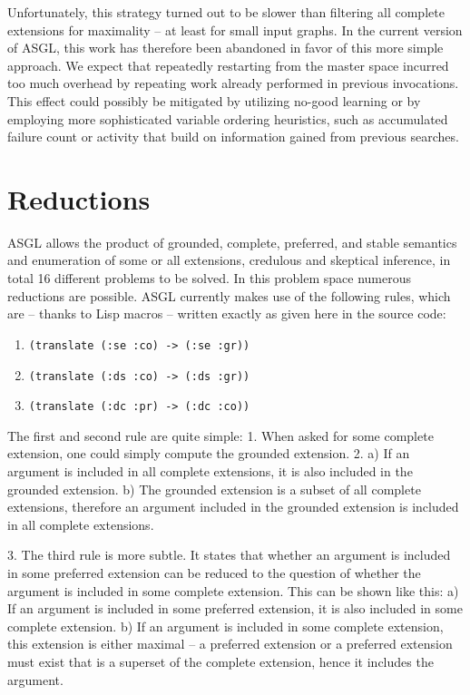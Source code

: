 \documentclass[runningheads,a4paper]{llncs}
\begin{document}
Unfortunately, this strategy turned out to be slower than filtering
all complete extensions for maximality -- at least for small input
graphs. In the current version of ASGL, this work has therefore been
abandoned in favor of this more simple approach. We expect that
repeatedly restarting from the master space incurred too much overhead
by repeating work already performed in previous invocations. This
effect could possibly be mitigated by utilizing no-good learning or by
employing more sophisticated variable ordering heuristics, such as
accumulated failure count or activity that build on
information gained from previous searches.

\section{Reductions}\label{sec:reductions}

ASGL allows the product of grounded, complete, preferred, and stable
semantics and enumeration of some or all extensions, credulous and
skeptical inference, in total 16 different problems to be solved. In
this problem space numerous reductions are possible. ASGL currently
makes use of the following rules, which are -- thanks to Lisp macros
-- written exactly as given here in the source code:

\begin{enumerate}
\item \texttt{(translate (:se :co) -> (:se :gr))}
\item \texttt{(translate (:ds :co) -> (:ds :gr))}
\item \texttt{(translate (:dc :pr) -> (:dc :co))}
\end{enumerate}

The first and second rule are quite simple: 1. When asked for some
complete extension, one could simply compute the grounded
extension. 2. a) If an argument is included in all complete extensions,
it is also included in the grounded extension. b) The grounded extension
is a subset of all complete extensions, therefore an argument included
in the grounded extension is included in all complete extensions.

3. The third rule is more subtle. It states that whether an argument
is included in some preferred extension can be reduced to the question
of whether the argument is included in some complete extension. This
can be shown like this: a) If an argument is included in some
preferred extension, it is also included in some complete
extension. b) If an argument is included in some complete extension,
this extension is either maximal -- a preferred extension or a
preferred extension must exist that is a superset of the complete
extension, hence it includes the argument.

{}

\end{document}
